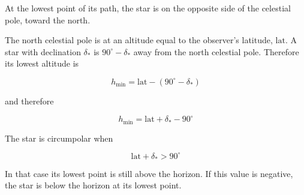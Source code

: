 At the lowest point of its path, the star is on the opposite side of the celestial pole, toward the north.

The north celestial pole is at an altitude equal to the observer's latitude, \(\mathrm{lat}\). A star with declination \(\delta_*\) is \(90^\circ - \delta_*\) away from the north celestial pole. Therefore its lowest altitude is

\[
h_{\min} = \mathrm{lat} - (90^\circ - \delta_*)
\]

and therefore

\[
h_{\min} = \mathrm{lat} + \delta_* - 90^\circ
\]

The star is circumpolar when

\[
\mathrm{lat} + \delta_* > 90^\circ
\]

In that case its lowest point is still above the horizon. If this value is negative, the star is below the horizon at its lowest point.